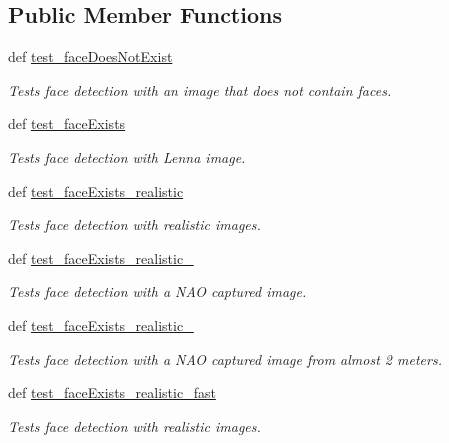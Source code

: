 \subsection*{Public Member Functions}
\begin{DoxyCompactItemize}
\item 
def \hyperlink{classfunctional__tests_1_1FaceDetFunc_ad00297274fd209b5417544feca4e2202}{test\-\_\-face\-Does\-Not\-Exist}
\begin{DoxyCompactList}\small\item\em Tests face detection with an image that does not contain faces. \end{DoxyCompactList}\item 
def \hyperlink{classfunctional__tests_1_1FaceDetFunc_acf87b7486a14e8cb90711b205ed59fdc}{test\-\_\-face\-Exists}
\begin{DoxyCompactList}\small\item\em Tests face detection with Lenna image. \end{DoxyCompactList}\item 
def \hyperlink{classfunctional__tests_1_1FaceDetFunc_a172b3f268ec490f02df4af12f14fc245}{test\-\_\-face\-Exists\-\_\-realistic}
\begin{DoxyCompactList}\small\item\em Tests face detection with realistic images. \end{DoxyCompactList}\item 
def \hyperlink{classfunctional__tests_1_1FaceDetFunc_ac4f8c1308171f3b2e2ee364a125d688f}{test\-\_\-face\-Exists\-\_\-realistic\-\_}
\begin{DoxyCompactList}\small\item\em Tests face detection with a N\-A\-O captured image. \end{DoxyCompactList}\item 
def \hyperlink{classfunctional__tests_1_1FaceDetFunc_ac4f8c1308171f3b2e2ee364a125d688f}{test\-\_\-face\-Exists\-\_\-realistic\-\_}
\begin{DoxyCompactList}\small\item\em Tests face detection with a N\-A\-O captured image from almost 2 meters. \end{DoxyCompactList}\item 
def \hyperlink{classfunctional__tests_1_1FaceDetFunc_a835cad2adf50c3d7dcc3f88a0b3e460e}{test\-\_\-face\-Exists\-\_\-realistic\-\_\-fast}
\begin{DoxyCompactList}\small\item\em Tests face detection with realistic images. \end{DoxyCompactList}\item 

\end{DoxyCompactItemize}
